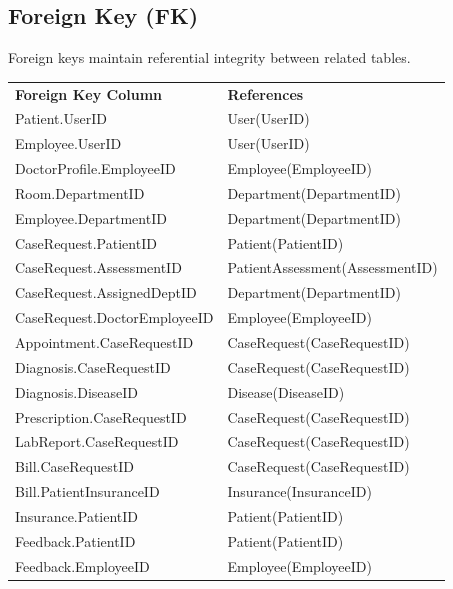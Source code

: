 \documentclass{article}
\newcommand{\theadcell}{\color{white}\bfseries}
\begin{document}
\subsection{Foreign Key (FK)}
Foreign keys maintain referential integrity between related tables.

\begin{center}
\begin{tabular}{L{5.5cm} L{7cm}}
   \theadcell Foreign Key Column & \theadcell References \\
   Patient.UserID               & User(UserID) \\
   Employee.UserID              & User(UserID) \\
   DoctorProfile.EmployeeID     & Employee(EmployeeID) \\
   Room.DepartmentID            & Department(DepartmentID) \\
   Employee.DepartmentID        & Department(DepartmentID) \\
   CaseRequest.PatientID        & Patient(PatientID) \\
   CaseRequest.AssessmentID     & PatientAssessment(AssessmentID) \\
   CaseRequest.AssignedDeptID   & Department(DepartmentID) \\
   CaseRequest.DoctorEmployeeID & Employee(EmployeeID) \\
   Appointment.CaseRequestID    & CaseRequest(CaseRequestID) \\
   Diagnosis.CaseRequestID      & CaseRequest(CaseRequestID) \\
   Diagnosis.DiseaseID          & Disease(DiseaseID) \\
   Prescription.CaseRequestID   & CaseRequest(CaseRequestID) \\
   LabReport.CaseRequestID      & CaseRequest(CaseRequestID) \\
   Bill.CaseRequestID           & CaseRequest(CaseRequestID) \\
   Bill.PatientInsuranceID      & Insurance(InsuranceID) \\
   Insurance.PatientID   & Patient(PatientID) \\
   Feedback.PatientID           & Patient(PatientID) \\
   Feedback.EmployeeID          & Employee(EmployeeID) \\
\end{tabular}
\end{center}
\end{document}
